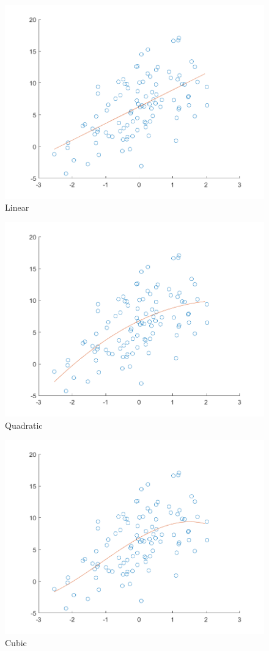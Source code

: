 \documentclass{article}
\begin{document}
{{        \begin{figure}[H]
            \centering
            \includegraphics[width = 0.6\linewidth]{2-2-linear-100-2.0.png}
            \caption{Linear}
        \end{figure}

        \begin{figure}[H]
            \centering
            \includegraphics[width = 0.6\linewidth]{2-2-quadratic-100-2.0.png}
            \caption{Quadratic}
        \end{figure}

        \begin{figure}[H]
            \centering
            \includegraphics[width = 0.6\linewidth]{2-2-cubic-100-2.0.png}
            \caption{Cubic}
        \end{figure}

}}
\end{document}
